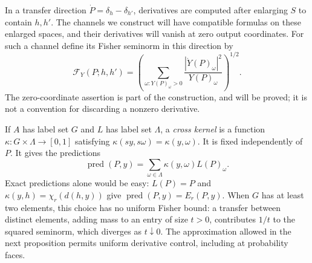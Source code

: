 In a transfer direction $\dot P=\delta_h-\delta_{h'}$, derivatives are
computed after enlarging $S$ to contain $h,h'$.  The channels we construct
will have compatible formulas on these enlarged spaces, and their
derivatives will vanish at zero output coordinates.  For such a channel
define its Fisher seminorm in
this direction by
\begin{equation}
 \mathcal F_Y(P;h,h')
 =\left(\sum_{\omega:Y(P)_\omega>0}
       \frac{|\dot Y(P)_\omega|^2}{Y(P)_\omega}\right)^{1/2}.
 \label{ch:fisher-definition}
\end{equation}
The zero-coordinate assertion is part of the construction, and will be
proved; it is not a convention for discarding a nonzero derivative.

If $A$ has label set $G$ and $L$ has label set $\Lambda$, a \emph{cross
kernel} is a function $\kappa:G\times\Lambda\to[0,1]$ satisfying
$\kappa(sy,s\omega)=\kappa(y,\omega)$.  It is fixed independently of $P$.
It gives the predictions
\begin{equation}
 \operatorname{pred}(P,y)
   =\sum_{\omega\in\Lambda}\kappa(y,\omega)L(P)_\omega.
 \label{ch:prediction-definition}
\end{equation}
Exact predictions alone would be easy: $L(P)=P$ and
$\kappa(y,h)=\chi_r(d(h,y))$ give $\operatorname{pred}(P,y)=E_r(P,y)$.
When $G$ has at least two elements, this choice has no uniform Fisher bound:
a transfer between distinct elements, adding mass to an entry of size
$t>0$, contributes $1/t$ to the squared seminorm, which diverges as
$t\downarrow0$.  The approximation allowed in the next proposition permits
uniform derivative control, including at probability faces.

